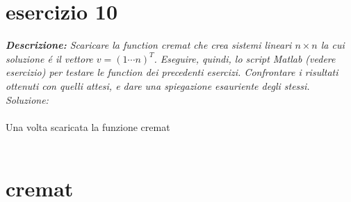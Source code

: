 \section{esercizio 10}
\textit{\textbf{Descrizione:} Scaricare la function cremat che crea sistemi lineari $n \times n$ la cui soluzione \'e il vettore $v = (1 \cdots n)^{T}$. Eseguire, quindi, lo script Matlab (vedere esercizio) per testare le function dei precedenti esercizi. Confrontare i risultati ottenuti con quelli attesi, e dare una spiegazione esauriente degli stessi.}\newline
\noindent\emph{Soluzione: }
\\~\\
Una volta scaricata la funzione cremat
\\~\\

\section*{cremat}


